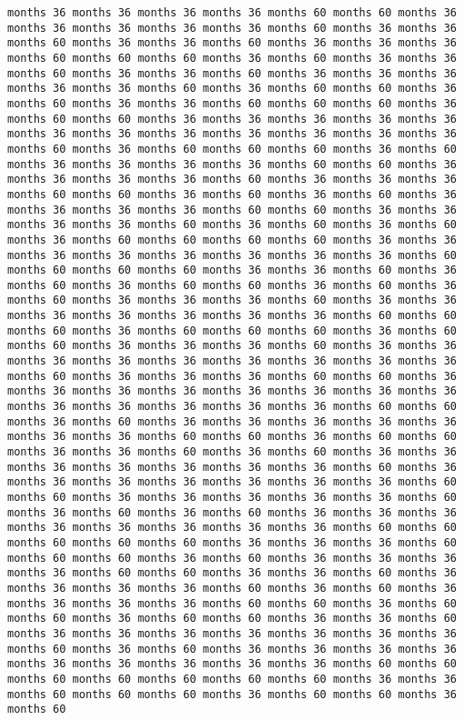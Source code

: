 \documentclass[11pt]{article}
\begin{document}
\begin{Verbatim}[commandchars=\\\{\}, frame=single, framerule=2mm, rulecolor=\color{outerrorbackground}]
months 36 months 36 months 36 months 36 months 60 months 60 months 36 months 36 months 36 months 36 months 36 months 60 months 36 months 36 months 60 months 36 months 36 months 60 months 36 months 36 months 36 months 60 months 60 months 60 months 36 months 60 months 36 months 36 months 60 months 36 months 36 months 60 months 36 months 36 months 36 months 36 months 36 months 60 months 36 months 60 months 60 months 36 months 60 months 36 months 36 months 60 months 60 months 60 months 36 months 60 months 60 months 36 months 36 months 36 months 36 months 36 months 36 months 36 months 36 months 36 months 36 months 36 months 36 months 60 months 36 months 60 months 60 months 60 months 36 months 60 months 36 months 36 months 36 months 36 months 60 months 60 months 36 months 36 months 36 months 36 months 60 months 36 months 36 months 36 months 60 months 60 months 36 months 60 months 36 months 60 months 36 months 36 months 36 months 36 months 60 months 60 months 36 months 36 months 36 months 36 months 60 months 36 months 60 months 36 months 60 months 36 months 60 months 60 months 60 months 60 months 36 months 36 months 36 months 36 months 36 months 36 months 36 months 36 months 60 months 60 months 60 months 60 months 36 months 36 months 60 months 36 months 60 months 36 months 60 months 60 months 36 months 60 months 36 months 60 months 36 months 36 months 36 months 60 months 36 months 36 months 36 months 36 months 36 months 36 months 36 months 60 months 60 months 60 months 36 months 60 months 60 months 60 months 36 months 60 months 60 months 36 months 36 months 36 months 60 months 36 months 36 months 36 months 36 months 36 months 36 months 36 months 36 months 36 months 60 months 36 months 36 months 36 months 60 months 60 months 36 months 36 months 36 months 36 months 36 months 36 months 36 months 36 months 36 months 36 months 36 months 36 months 36 months 60 months 60 months 36 months 60 months 36 months 36 months 36 months 36 months 36 months 36 months 36 months 60 months 60 months 36 months 60 months 60 months 36 months 36 months 60 months 36 months 60 months 36 months 36 months 36 months 36 months 36 months 36 months 36 months 60 months 36 months 36 months 36 months 36 months 36 months 36 months 36 months 60 months 60 months 36 months 36 months 36 months 36 months 36 months 60 months 36 months 60 months 36 months 60 months 36 months 36 months 36 months 36 months 36 months 36 months 36 months 36 months 60 months 60 months 60 months 60 months 60 months 36 months 36 months 36 months 60 months 60 months 60 months 36 months 60 months 36 months 36 months 36 months 36 months 60 months 60 months 36 months 36 months 60 months 36 months 36 months 36 months 36 months 60 months 36 months 60 months 36 months 36 months 36 months 36 months 60 months 60 months 36 months 60 months 60 months 36 months 60 months 60 months 36 months 36 months 60 months 36 months 36 months 36 months 36 months 36 months 36 months 36 months 60 months 36 months 60 months 36 months 36 months 36 months 36 months 36 months 36 months 36 months 36 months 36 months 60 months 60 months 60 months 60 months 60 months 60 months 60 months 36 months 36 months 60 months 60 months 60 months 36 months 60 months 60 months 36 months 60 
\end{Verbatim}
\end{document}
